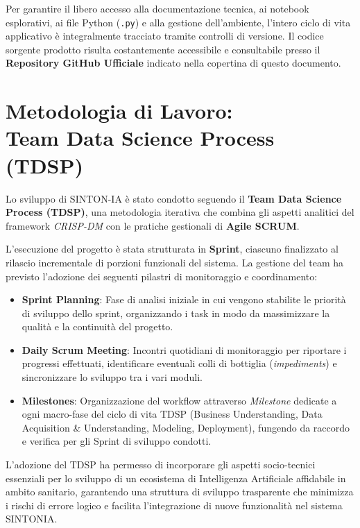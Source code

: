 Per garantire il libero accesso alla documentazione tecnica, ai notebook esplorativi, ai file Python (\texttt{.py}) e alla gestione dell'ambiente, l'intero ciclo di vita applicativo è integralmente tracciato tramite controlli di versione. Il codice sorgente prodotto risulta costantemente accessibile e consultabile presso il \textbf{Repository GitHub Ufficiale} indicato nella copertina di questo documento.

\clearpage
\section{Metodologia di Lavoro: \\ Team Data Science Process (TDSP)}
\label{sec:metodologia_tdsp}

Lo sviluppo di SINTON-IA è stato condotto seguendo il \textbf{Team Data Science Process (TDSP)}, una metodologia iterativa che combina gli aspetti analitici del framework \textit{CRISP-DM} con le pratiche gestionali di \textbf{Agile SCRUM}.

L'esecuzione del progetto è stata strutturata in \textbf{Sprint}, ciascuno finalizzato al rilascio incrementale di porzioni funzionali del sistema. La gestione del team ha previsto l'adozione dei seguenti pilastri di monitoraggio e coordinamento:
\begin{itemize}
    \item \textbf{Sprint Planning}: Fase di analisi iniziale in cui vengono stabilite le priorità di sviluppo dello sprint, organizzando i task in modo da massimizzare la qualità e la continuità del progetto.
    \item \textbf{Daily Scrum Meeting}: Incontri quotidiani di monitoraggio per riportare i progressi effettuati, identificare eventuali colli di bottiglia (\textit{impediments}) e sincronizzare lo sviluppo tra i vari moduli.
    \item \textbf{Milestones}: Organizzazione del workflow attraverso \textit{Milestone} dedicate a ogni macro-fase del ciclo di vita TDSP (Business Understanding, Data Acquisition \& Understanding, Modeling, Deployment), fungendo da raccordo e verifica per gli Sprint di sviluppo condotti.
\end{itemize}

L'adozione del TDSP ha permesso di incorporare gli aspetti socio-tecnici essenziali per lo sviluppo di un ecosistema di Intelligenza Artificiale affidabile in ambito sanitario, garantendo una struttura di sviluppo trasparente che minimizza i rischi di errore logico e facilita l'integrazione di nuove funzionalità nel sistema SINTONIA.

